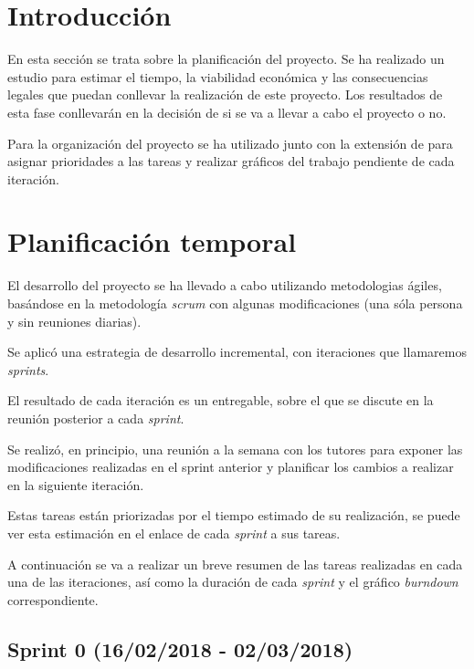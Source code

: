 
\section{Introducción}

En esta sección se trata sobre la planificación del proyecto. Se ha realizado un estudio para estimar el tiempo, la viabilidad económica y las consecuencias legales que puedan conllevar la realización de este proyecto. Los resultados de esta fase conllevarán en la decisión de si se va a llevar a cabo el proyecto o no.

Para la organización del proyecto se ha utilizado  junto con la extensión de  para asignar prioridades a las tareas y realizar gráficos del trabajo pendiente de cada iteración.

\section{Planificación temporal}

El desarrollo del proyecto se ha llevado a cabo utilizando metodologias ágiles, basándose en la metodología \textit{scrum} con algunas modificaciones (una sóla persona y sin reuniones diarias).

Se aplicó una estrategia de desarrollo incremental, con iteraciones que llamaremos \textit{sprints}.

El resultado de cada iteración es un entregable, sobre el que se discute en la reunión posterior a cada \textit{sprint}.

Se realizó, en principio, una reunión a la semana con los tutores para exponer las modificaciones realizadas en el sprint anterior y planificar los cambios a realizar en la siguiente iteración. 

Estas tareas están priorizadas por el tiempo estimado de su realización, se puede ver esta estimación en el enlace de cada \textit{sprint} a sus tareas. 

A continuación se va a realizar un breve resumen de las tareas realizadas en cada una de las iteraciones, así como la duración de cada \textit{sprint} y el gráfico \textit{burndown} correspondiente.

\subsection{Sprint 0 (16/02/2018 - 02/03/2018)}

